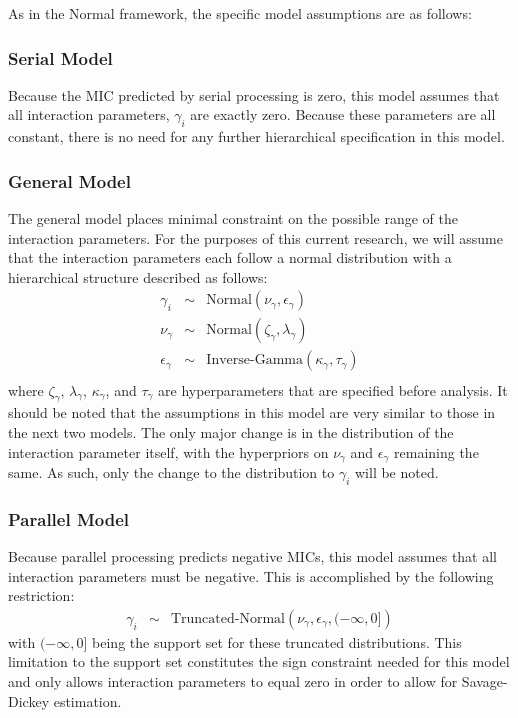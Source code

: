As in the Normal framework, the specific model assumptions are as follows:

\subsubsection{Serial Model}
Because the MIC predicted by serial processing is zero, this model
assumes that all interaction parameters, $\gamma_i$ are exactly zero.
Because these parameters are all constant, there is no need for any
further hierarchical specification in this model.

\subsubsection{General Model}
The general model places minimal constraint on the possible range of
the interaction parameters.  For the purposes of this current
research, we will assume that the interaction parameters each follow a
normal distribution with a hierarchical structure described as follows:
\begin{eqnarray*}
\gamma_i &\sim& \mbox{Normal}\left(\nu_\gamma,\epsilon_\gamma\right)\\
\nu_\gamma &\sim& \mbox{Normal}\left(\zeta_\gamma,\lambda_\gamma\right)\\
\epsilon_\gamma &\sim& \mbox{Inverse-Gamma}\left(\kappa_\gamma,\tau_\gamma\right)\\
\end{eqnarray*}
where $\zeta_\gamma$, $\lambda_\gamma$, $\kappa_\gamma$, and
$\tau_\gamma$ are hyperparameters that are specified before analysis.
It should be noted that the assumptions in this model are very similar
to those in the next two models.  The only major change is in the
distribution of the interaction parameter itself, with the hyperpriors
on $\nu_\gamma$ and $\epsilon_\gamma$ remaining the same.  As such,
only the change to the distribution to $\gamma_i$ will be noted.

\subsubsection{Parallel Model}
Because parallel processing predicts negative MICs, this model assumes
that all interaction parameters must be negative.  This is
accomplished by the following restriction:
\begin{eqnarray*}
\gamma_i &\sim& \mbox{Truncated-Normal}\left(\nu_\gamma,\epsilon_\gamma,(-\infty,0]\right)
\end{eqnarray*}
with $(-\infty,0]$ being the support set for these truncated
distributions.  This limitation to the support set constitutes the
sign constraint needed for this model and only allows interaction
parameters to equal zero in order to allow for Savage-Dickey
estimation.

